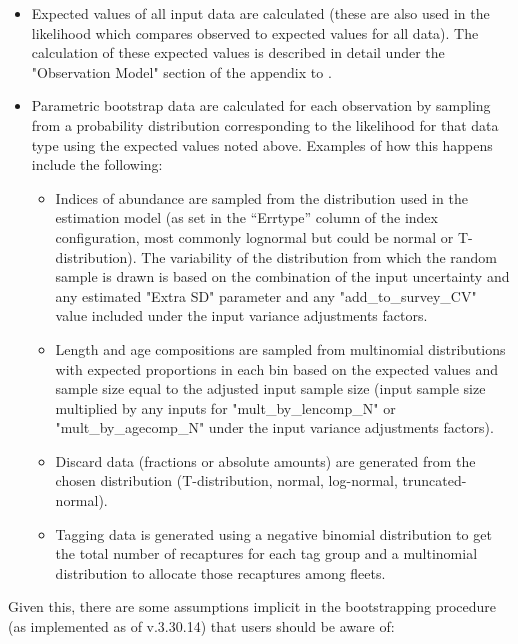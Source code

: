 \begin{itemize}
	\item Expected values of all input data are calculated (these are also used in the likelihood which compares observed to expected values for all data). The calculation of these expected values is described in detail under the "Observation Model" section of the appendix to \citet{methot_stock_2013}. \
	
	\item Parametric bootstrap data are calculated for each observation by sampling from a probability distribution corresponding to the likelihood for that data type using the expected values noted above. Examples of how this happens include the following:
	
	\begin{itemize}
		\item Indices of abundance are sampled from the distribution used in the estimation model (as set in the “Errtype” column of the index configuration, most commonly lognormal but could be normal or T-distribution). The variability of the distribution from which the random sample is drawn is based on the combination of the input uncertainty and any estimated "Extra SD" parameter and any "add\_to\_survey\_CV" value included under the input variance adjustments factors.
		
		\item Length and age compositions are sampled from multinomial distributions with expected proportions in each bin based on the expected values and sample size equal to the adjusted input sample size (input sample size multiplied by any inputs for "mult\_by\_lencomp\_N" or "mult\_by\_agecomp\_N" under the input variance adjustments factors).
		
		\item Discard data (fractions or absolute amounts) are generated from the chosen distribution (T-distribution, normal, log-normal, truncated-normal).
		
		\item Tagging data is generated using a negative binomial distribution to get the total number of recaptures for each tag group and a multinomial distribution to allocate those recaptures among fleets.
	\end{itemize}
\end{itemize}

Given this, there are some assumptions implicit in the bootstrapping procedure (as implemented as of v.3.30.14) that users should be aware of:

